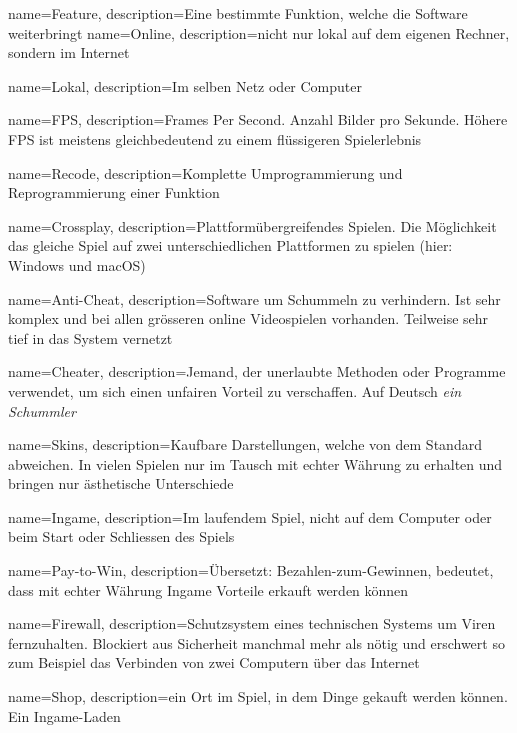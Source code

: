 
{
  name={Feature},
  description={Eine bestimmte Funktion, welche die Software weiterbringt}
}
{
  name={Online},
  description={nicht nur lokal auf dem eigenen Rechner, sondern im Internet}
}

{
  name={Lokal},
  description={Im selben Netz oder Computer}
}

{
  name={FPS},
  description={Frames Per Second. Anzahl Bilder pro Sekunde. Höhere FPS ist meistens gleichbedeutend zu einem flüssigeren Spielerlebnis}
}

{
  name={Recode},
  description={Komplette Umprogrammierung und Reprogrammierung einer Funktion}
}

{
  name={Crossplay},
  description={Plattformübergreifendes Spielen. Die Möglichkeit das gleiche Spiel auf zwei unterschiedlichen Plattformen zu spielen (hier: Windows und macOS)}
}

{
  name={Anti-Cheat},
  description={Software um Schummeln zu verhindern.
  Ist sehr komplex und bei allen grösseren online Videospielen vorhanden.
  Teilweise sehr tief in das System vernetzt}
}

{
  name={Cheater},
  description={Jemand, der unerlaubte Methoden oder Programme verwendet, um sich einen unfairen Vorteil zu verschaffen.
  Auf Deutsch \textit{ein Schummler}}
}

{
  name={Skins},
  description={Kaufbare Darstellungen, welche von dem Standard abweichen.
  In vielen Spielen nur im Tausch mit echter Währung zu erhalten und bringen nur ästhetische Unterschiede}
}

{
  name={Ingame},
  description={Im laufendem Spiel, nicht auf dem Computer oder beim Start oder Schliessen des Spiels}
}

{
  name={Pay-to-Win},
  description={Übersetzt: Bezahlen-zum-Gewinnen, bedeutet, dass mit echter Währung Ingame Vorteile erkauft werden können}
}

{
  name={Firewall},
  description={Schutzsystem eines technischen Systems um Viren fernzuhalten.
  Blockiert aus Sicherheit manchmal mehr als nötig und erschwert so zum Beispiel das Verbinden von zwei Computern über das Internet}
}

{
  name={Shop},
  description={ein Ort im Spiel, in dem Dinge gekauft werden können. Ein Ingame-Laden}
}


